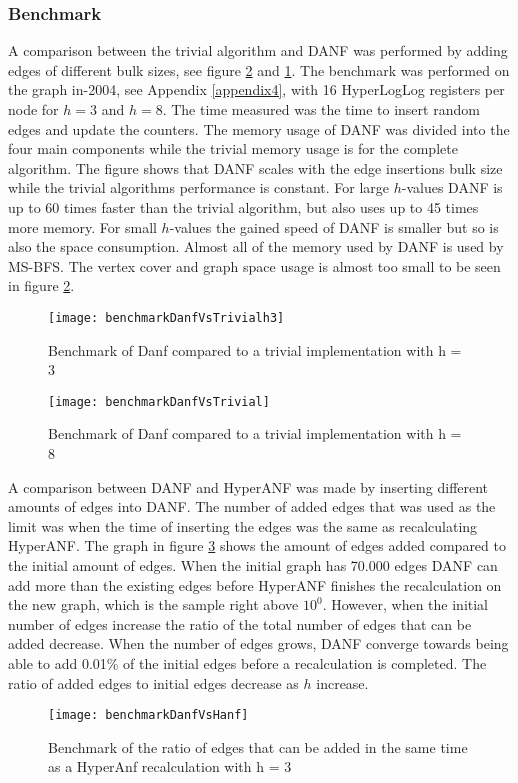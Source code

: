 \subsubsection{Benchmark}
A comparison between the trivial algorithm and DANF was performed by adding edges of different bulk sizes, see figure \ref{fig:benchmarkDanfVsTrivial} and \ref{fig:benchmarkDanfVsTrivialh3}. The benchmark was performed on the graph in-2004, see Appendix \ref{appendix4}, with 16 HyperLogLog registers per node for $h = 3$ and $h = 8$. The time measured was the time to insert random edges and update the counters. The memory usage of DANF was divided into the four main components while the trivial memory usage is for the complete algorithm. The figure shows that DANF scales with the edge insertions bulk size while the trivial algorithms performance is constant. For large $h$-values DANF is up to 60 times faster than the trivial algorithm, but also uses up to 45 times more memory. For small $h$-values the gained speed of DANF is smaller but so is also the space consumption. Almost all of the memory used by DANF is used by MS-BFS. The vertex cover and graph space usage is almost too small to be seen in figure \ref{fig:benchmarkDanfVsTrivial}. 

\begin{figure}[h]
\centering
\texttt{[image: benchmarkDanfVsTrivialh3]}    
\captionsetup{justification=centering}
\caption {Benchmark of Danf compared to a trivial implementation with h = 3}
\label{fig:benchmarkDanfVsTrivialh3}
\end{figure}

\begin{figure}[h]
\centering
\texttt{[image: benchmarkDanfVsTrivial]}    
\captionsetup{justification=centering}
\caption {Benchmark of Danf compared to a trivial implementation with h = 8}
\label{fig:benchmarkDanfVsTrivial}
\end{figure}

A comparison between DANF and HyperANF was made by inserting different amounts of edges into DANF. The number of added edges that was used as the limit was when the time of inserting the edges was the same as recalculating HyperANF. The graph in figure \ref{fig:benchmarkDanfVsHanf} shows the amount of edges added compared to the initial amount of edges. When the initial graph has 70.000 edges DANF can add more than the existing edges before HyperANF finishes the recalculation on the new graph, which is the sample right above $10^0$. However, when the initial number of edges increase the ratio of the total number of edges that can be added decrease. When the number of edges grows, DANF converge towards being able to add 0.01\% of the initial edges before a recalculation is completed. The ratio of added edges to initial edges decrease as $h$ increase.

\begin{figure}[h]
\centering
\texttt{[image: benchmarkDanfVsHanf]}    
\captionsetup{justification=centering}
\caption {Benchmark of the ratio of edges that can be added in the same time as a HyperAnf recalculation with h = 3}
\label{fig:benchmarkDanfVsHanf}
\end{figure}







